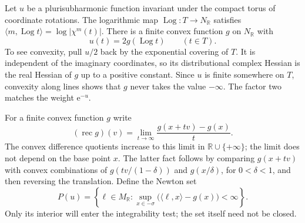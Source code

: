 Let $u$ be a plurisubharmonic function invariant under the compact torus of coordinate rotations. The logarithmic map $\operatorname{Log}\colon T\to N_{\mathbb R}$ satisfies $\langle m,\operatorname{Log}t\rangle=\log|\chi^m(t)|$. There is a finite convex function $g$ on $N_{\mathbb R}$ with
\[
 u(t)=2g(\operatorname{Log}t)\qquad(t\in T).
\]
To see convexity, pull $u/2$ back by the exponential covering of $T$. It is independent of the imaginary coordinates, so its distributional complex Hessian is the real Hessian of $g$ up to a positive constant. Since $u$ is finite somewhere on $T$, convexity along lines shows that $g$ never takes the value $-\infty$. The factor two matches the weight $\mathrm e^{-u}$.

For a finite convex function $g$ write
\[
 (\operatorname{rec}g)(v)=
       \lim_{t\to\infty}\frac{g(x+tv)-g(x)}t.
\]
The convex difference quotients increase to this limit in $\mathbb R\cup\{+\infty\}$; the limit does not depend on the base point $x$. The latter fact follows by comparing $g(x+tv)$ with convex combinations of $g(t v/(1-\delta))$ and $g(x/\delta)$, for $0<\delta<1$, and then reversing the translation. Define the Newton set
\begin{equation}\label{eq:toric-newton-set}
 P(u)=\left\{\ell\in M_{\mathbb R}:
     \sup_{x\in-\sigma}\bigl(\langle\ell,x\rangle-g(x)\bigr)<\infty\right\}.
\end{equation}
Only its interior will enter the integrability test; the set itself need not be closed.

